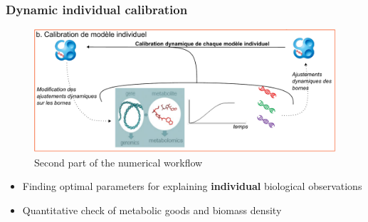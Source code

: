 \documentclass[8pt]{beamer}
\begin{document}
\begin{frame}
\frametitle{Dynamic individual calibration}
\begin{figure}
\includegraphics[width=\textwidth]{figures/calibration.pdf}
\caption{Second part of the numerical workflow}
\end{figure}

\begin{block}{}
\begin{itemize}
\item Finding optimal parameters for explaining \textbf{individual} biological observations
\item Quantitative check of metabolic goods and biomass density
\end{itemize}
\end{block}

\end{frame}
\end{document}
